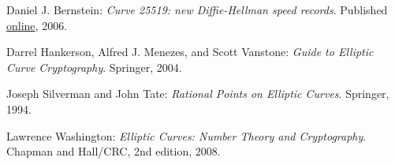 \documentclass{article}
\begin{document}
\clearpage

\begin{thebibliography}{9}

	Daniel J. Bernstein:
	\emph{Curve 25519: new Diffie-Hellman speed records}.
	Published \href{http://cr.yp.to/ecdh/curve25519-20060209.pdf}{online},
	2006.

	Darrel Hankerson, Alfred J. Menezes, and Scott Vanstone:
	\emph{Guide to Elliptic Curve Cryptography}.
	Springer,
	2004.

	Joseph Silverman and John Tate:
	\emph{Rational Points on Elliptic Curves}.
	Springer,
	1994.

	Lawrence Washington:
	\emph{Elliptic Curves: Number Theory and Cryptography}.
	Chapman and Hall/CRC,
	2nd edition,
	2008.

\end{thebibliography}
\end{document}
